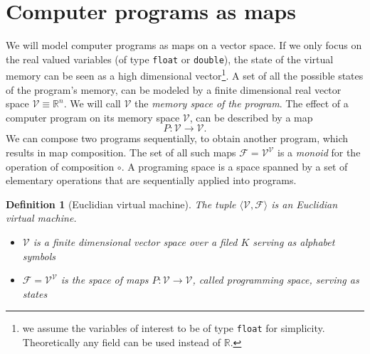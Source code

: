 \documentclass{article}
\newcommand{\RR}{\mathbb{R}}
\newcommand{\VV}{\mathcal{V}}
\newcommand{\F}{\mathcal{F}}
\newtheorem{definicija}{Definition}[section]
\begin{document}
\section{Computer programs as maps}
We will model computer programs as maps on a vector space. If
we only focus on the real valued variables (of type \texttt{float} or
\texttt{double}),  the state of the virtual memory can be seen as a high
dimensional vector\footnote{we assume the variables of interest to be of type \texttt{float} for
  simplicity. Theoretically any field can be used instead of $\RR$.}. 
A set of all the possible states of the program's memory,
can be modeled by a finite dimensional real vector space $\VV\equiv \RR^n$. We
will call $\VV$ the \emph{memory space of the program}. The effect of a computer
program on its memory space $\VV$, can be described by a map
\begin{equation}
  \label{eq:map}
  P:\VV\to \VV.
\end{equation}
We can compose two programs sequentially, to obtain another program, which
results in map composition. The set of all such maps $\F=\VV^\VV$ is a
\emph{monoid} for the operation of composition $\circ$. A programing space is
a space spanned by a set of elementary operations that are sequentially applied into programs. 
\begin{definicija}[Euclidian virtual machine] The tuple $\langle \VV,\F\rangle$ is an Euclidian virtual machine.
  \begin{itemize}
  \item
  $\VV$ is a finite dimensional vector space over a filed $K$ serving as alphabet symbols
  \item
  $\F= \VV^\VV$ is the space of maps $P:\VV\to \VV$, called \emph{programming space}, serving as states
  \end{itemize}  
\end{definicija}
\end{document}

